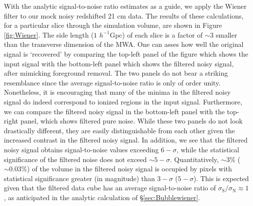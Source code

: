 With the analytic signal-to-noise ratio estimates as a guide, we apply
the Wiener filter to our mock noisy redshifted 21 cm data. The results
of these calculations, for a particular slice through the simulation
volume, are shown in Figure \ref{fig:Wiener}.  The side length ($1$ $h^{-1}$Gpc) of each slice
is a factor of $\sim 3$ smaller than the transverse dimension of the MWA. One can asses how well
the original signal is `recovered' by comparing the top-left panel of
the figure which shows the input signal with the bottom-left panel which
shows the filtered noisy signal, after mimicking foreground
removal. The two panels do not bear a striking resemblance since the
average signal-to-noise ratio is only of order
unity. Nonetheless, it is encouraging that many of the minima in 
the filtered noisy
signal do indeed correspond to ionized regions in the input signal.  Furthermore, we can compare the filtered noisy signal in the
bottom-left panel with the top-right panel, which shows filtered pure
noise. While these two panels do not look drastically different, they
are easily distinguishable from each other given the increased
contrast in the filtered noisy signal. 
In addition, we see that the
filtered noisy signal obtains signal-to-noise values exceeding
$6-\sigma$, while the statistical significance of the filtered noise
does not exceed $\sim 5-\sigma$. Quantitatively, $\sim 3\%$
($\sim 0.03\%$) of the volume in the filtered noisy signal is occupied
by pixels with statistical significance greater (in magnitude) than
$3-\sigma$ ($5-\sigma$). This is expected given that the filtered data cube
has an average signal-to-noise ratio of $\sigma_{\text{S}}/\sigma_{\text{N}} \approx 1$, as anticipated in the analytic calculation
of \S\ref{sec:Bubblewiener}.

